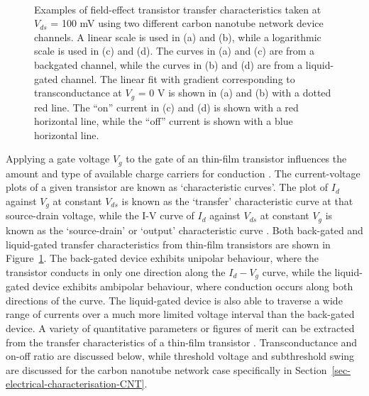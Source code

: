 \documentclass[
  a4paper,
]{scrbook}
\begin{document}
\begin{figure}
\begin{minipage}[t]{0.45\linewidth}
{{}

}

\end{minipage}%
%
\begin{minipage}[t]{0.01\linewidth}

{\centering 

~

}

\end{minipage}%

\caption{\label{fig-gating-transfer}Examples of field-effect transistor
transfer characteristics taken at \(V_{ds}\) = 100 mV using two
different carbon nanotube network device channels. A linear scale is
used in (a) and (b), while a logarithmic scale is used in (c) and (d).
The curves in (a) and (c) are from a backgated channel, while the curves
in (b) and (d) are from a liquid-gated channel. The linear fit with
gradient corresponding to transconductance at \(V_g\) = 0 V is shown in
(a) and (b) with a dotted red line. The ``on'' current in (c) and (d) is
shown with a red horizontal line, while the ``off'' current is shown
with a blue horizontal line.}

\end{figure}

Applying a gate voltage \(V_g\) to the gate of an thin-film transistor
influences the amount and type of available charge carriers for
conduction \autocite{Avouris2007,Tran2016,Heller2009a}. The
current-voltage plots of a given transistor are known as `characteristic
curves'. The plot of \(I_d\) against \(V_g\) at constant \(V_{ds}\) is
known as the `transfer' characteristic curve at that source-drain
voltage, while the I-V curve of \(I_d\) against \(V_{ds}\) at constant
\(V_g\) is known as the `source-drain' or `output' characteristic curve
\autocite{Petti2016,Shkodra2021}. Both back-gated and liquid-gated
transfer characteristics from thin-film transistors are shown in
Figure~\ref{fig-gating-transfer}. The back-gated device exhibits
unipolar behaviour, where the transistor conducts in only one direction
along the \(I_d - V_g\) curve, while the liquid-gated device exhibits
ambipolar behaviour, where conduction occurs along both directions of
the curve. The liquid-gated device is also able to traverse a wide range
of currents over a much more limited voltage interval than the
back-gated device. A variety of quantitative parameters or figures of
merit can be extracted from the transfer characteristics of a thin-film
transistor \autocite{Petti2016}. Transconductance and on-off ratio are
discussed below, while threshold voltage and subthreshold swing are
discussed for the carbon nanotube network case specifically in
Section~\ref{sec-electrical-characterisation-CNT}.
\end{document}
